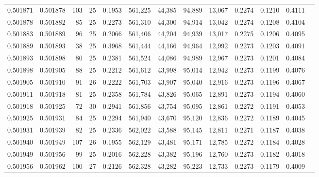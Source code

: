 \begin{tabular}{rrrrrrrrrrrrr}
0.501871 & 0.501878 & 103 &  25 &                                     0.1953 & 561,225 &  44,385 &  94,889 &  13,067 & 0.2274 & 0.1210 & 0.4111 \\
0.501878 & 0.501882 &  85 &  25 &                                     0.2273 & 561,310 &  44,300 &  94,914 &  13,042 & 0.2274 & 0.1208 & 0.4104 \\
0.501883 & 0.501889 &  96 &  25 &                                     0.2066 & 561,406 &  44,204 &  94,939 &  13,017 & 0.2275 & 0.1206 & 0.4095 \\
0.501889 & 0.501893 &  38 &  25 &                                     0.3968 & 561,444 &  44,166 &  94,964 &  12,992 & 0.2273 & 0.1203 & 0.4091 \\
0.501893 & 0.501898 &  80 &  25 &                                     0.2381 & 561,524 &  44,086 &  94,989 &  12,967 & 0.2273 & 0.1201 & 0.4084 \\
0.501898 & 0.501905 &  88 &  25 &                                     0.2212 & 561,612 &  43,998 &  95,014 &  12,942 & 0.2273 & 0.1199 & 0.4076 \\
0.501905 & 0.501910 &  91 &  26 &                                     0.2222 & 561,703 &  43,907 &  95,040 &  12,916 & 0.2273 & 0.1196 & 0.4067 \\
0.501911 & 0.501918 &  81 &  25 &                                     0.2358 & 561,784 &  43,826 &  95,065 &  12,891 & 0.2273 & 0.1194 & 0.4060 \\
0.501918 & 0.501925 &  72 &  30 &                                     0.2941 & 561,856 &  43,754 &  95,095 &  12,861 & 0.2272 & 0.1191 & 0.4053 \\
0.501925 & 0.501931 &  84 &  25 &                                     0.2294 & 561,940 &  43,670 &  95,120 &  12,836 & 0.2272 & 0.1189 & 0.4045 \\
0.501931 & 0.501939 &  82 &  25 &                                     0.2336 & 562,022 &  43,588 &  95,145 &  12,811 & 0.2271 & 0.1187 & 0.4038 \\
0.501940 & 0.501949 & 107 &  26 &                                     0.1955 & 562,129 &  43,481 &  95,171 &  12,785 & 0.2272 & 0.1184 & 0.4028 \\
0.501949 & 0.501956 &  99 &  25 &                                     0.2016 & 562,228 &  43,382 &  95,196 &  12,760 & 0.2273 & 0.1182 & 0.4018 \\
0.501956 & 0.501962 & 100 &  27 &                                     0.2126 & 562,328 &  43,282 &  95,223 &  12,733 & 0.2273 & 0.1179 & 0.4009 \\

\end{tabular}
